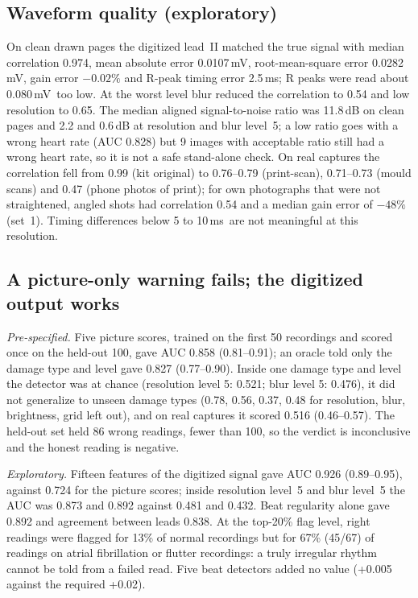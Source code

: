 \documentclass[11pt,a4paper]{article}
\newcommand{\ms}{\,ms}
\newcommand{\mV}{\,mV}
\begin{document}
\subsection{Waveform quality (exploratory)}
On clean drawn pages the digitized lead~II matched the true signal with median correlation 0.974, mean absolute error 0.0107\mV, root-mean-square error 0.0282\mV, gain error $-0.02\%$ and R-peak timing error 2.5\ms; R peaks were read about 0.080\mV\ too low. At the worst level blur reduced the correlation to 0.54 and low resolution to 0.65. The median aligned signal-to-noise ratio was 11.8\,dB on clean pages and 2.2 and 0.6\,dB at resolution and blur level~5; a low ratio goes with a wrong heart rate (AUC 0.828) but 9 images with acceptable ratio still had a wrong heart rate, so it is not a safe stand-alone check. On real captures the correlation fell from 0.99 (kit original) to 0.76--0.79 (print-scan), 0.71--0.73 (mould scans) and 0.47 (phone photos of print); for own photographs that were not straightened, angled shots had correlation 0.54 and a median gain error of $-48\%$ (set~1). Timing differences below 5 to 10\ms\ are not meaningful at this resolution.

\subsection{A picture-only warning fails; the digitized output works}
\emph{Pre-specified.} Five picture scores, trained on the first 50 recordings and scored once on the held-out 100, gave AUC 0.858 (0.81--0.91); an oracle told only the damage type and level gave 0.827 (0.77--0.90). Inside one damage type and level the detector was at chance (resolution level 5: 0.521; blur level 5: 0.476), it did not generalize to unseen damage types (0.78, 0.56, 0.37, 0.48 for resolution, blur, brightness, grid left out), and on real captures it scored 0.516 (0.46--0.57). The held-out set held 86 wrong readings, fewer than 100, so the verdict is inconclusive and the honest reading is negative.

\emph{Exploratory.} Fifteen features of the digitized signal gave AUC 0.926 (0.89--0.95), against 0.724 for the picture scores; inside resolution level~5 and blur level~5 the AUC was 0.873 and 0.892 against 0.481 and 0.432. Beat regularity alone gave 0.892 and agreement between leads 0.838. At the top-20\% flag level, right readings were flagged for 13\% of normal recordings but for 67\% (45/67) of readings on atrial fibrillation or flutter recordings: a truly irregular rhythm cannot be told from a failed read. Five beat detectors added no value (+0.005 against the required +0.02).
\end{document}
